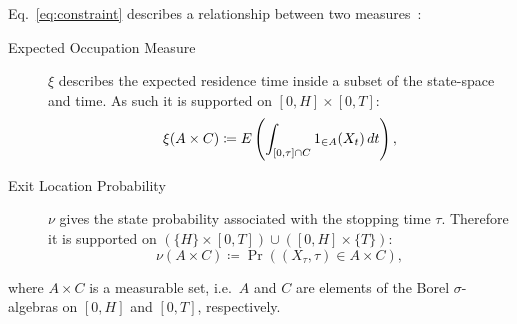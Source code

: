 Eq.~\eqref{eq:constraint}  describes a relationship between
two measures~\cite[Chapter~9.2]{lasserre2010moments}:
\begin{description}
\item[Expected Occupation Measure] $\xi$ describes the expected residence time inside a subset of the state-space and time. As such it is supported on $[0,H]\times [0,T]$:
\begin{equation}\label{eq:ex_occ_measure}
    \xi(A\times C) \coloneqq {E}\left(\int_{[0,\tau]\cap {C}}{1}_{\in A}(X_t)\,dt\right),
\end{equation}
\item [Exit Location Probability] $\nu$ gives the state probability associated with the stopping time $\tau$. Therefore it is supported on $(\{H\}\times[0,T]) \cup
([0,H]\times\{T\})$:
\begin{equation}\label{eq:exit_loc_measure}
    \nu(A\times C)\coloneqq \Pr((X_{\tau},\tau)\in A\times C),
\end{equation}
\end{description}
where $A\times C$ is a measurable set, i.e.\ $A$ and $C$ are elements of the Borel $\sigma$-algebras on $[0,H]$ and $[0,T]$, respectively.

